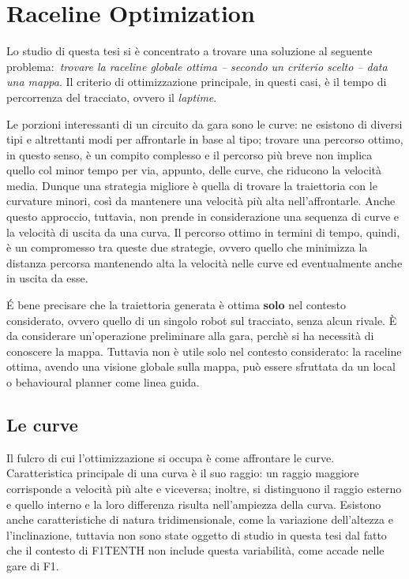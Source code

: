 
\chapter{Raceline Optimization}
\label{chap:opt}

Lo studio di questa tesi si è concentrato a trovare una soluzione al seguente problema:\
\textit{trovare la raceline globale ottima \emph{\footnotesize -- secondo un criterio scelto --} data una mappa}.
Il criterio di ottimizzazione principale, in questi casi, è il tempo di percorrenza del tracciato, ovvero
il \textit{laptime}.

Le porzioni interessanti di un circuito da gara sono le curve: ne esistono di diversi tipi e altrettanti
modi per affrontarle in base al tipo; trovare una percorso ottimo, in questo senso, è un compito complesso e
il percorso più breve non implica quello col minor tempo per via, appunto, delle curve, che riducono la
velocità media. Dunque una strategia migliore è quella di trovare la traiettoria con le curvature minori,
così da mantenere una velocità più alta nell'affrontarle. Anche questo approccio, tuttavia, non prende in
considerazione una sequenza di curve e la velocità di uscita da una curva. Il percorso ottimo in termini
di tempo, quindi, è un compromesso tra queste due strategie, ovvero quello che minimizza la distanza
percorsa mantenendo alta la velocità nelle curve ed eventualmente anche in uscita da esse.

É bene precisare che la traiettoria generata è ottima \textbf{solo} nel contesto considerato, ovvero
quello di un singolo robot sul tracciato, senza alcun rivale. È da considerare un'operazione preliminare
alla gara, perchè si ha necessità di conoscere la mappa.
Tuttavia non è utile solo nel contesto considerato: la raceline ottima, avendo una visione globale sulla
mappa, può essere sfruttata da un local o behavioural planner come linea guida.

\section{Le curve}
Il fulcro di cui l'ottimizzazione si occupa è come affrontare le curve.\\
Caratteristica principale di una curva è il suo raggio: un raggio maggiore corrisponde a velocità più alte
e viceversa; inoltre, si distinguono il raggio esterno e quello interno e la loro differenza risulta
nell'ampiezza della curva.
Esistono anche caratteristiche di natura tridimensionale, come la variazione dell'altezza e
l'inclinazione, tuttavia non sono state oggetto di studio in questa tesi dal fatto che il contesto di
F1TENTH non include questa variabilità, come accade nelle gare di F1.

